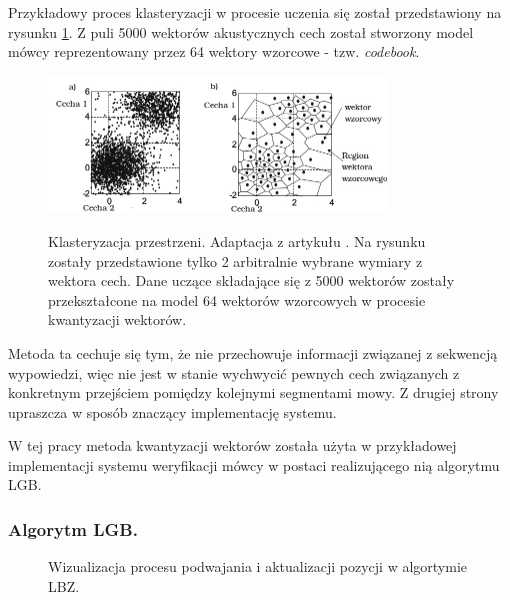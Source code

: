 Przykładowy proces klasteryzacji w procesie uczenia się został przedstawiony na rysunku \ref{VQjpg}. Z puli 5000 wektorów akustycznych cech został stworzony model mówcy reprezentowany przez 64 wektory wzorcowe - tzw. \textit{codebook}.

\begin{figure}[ht!]
  \centering
    \includegraphics[width=0.8\textwidth]{overwiewVQ.jpg}
    \label{VQjpg}
    \caption{Klasteryzacja przestrzeni. Adaptacja z artykułu \cite{overview}. Na rysunku zostały przedstawione tylko 2 arbitralnie wybrane wymiary z wektora cech. Dane uczące składające się z 5000 wektorów zostały przekształcone na model 64 wektorów wzorcowych w procesie kwantyzacji wektorów.}
\end{figure}

Metoda ta cechuje się tym, że nie przechowuje informacji związanej z sekwencją wypowiedzi, więc nie jest w stanie wychwycić pewnych cech związanych z konkretnym przejściem pomiędzy kolejnymi segmentami mowy. Z drugiej strony upraszcza w sposób znaczący implementację systemu.


W tej pracy metoda kwantyzacji wektorów została użyta w przykładowej implementacji systemu weryfikacji mówcy w postaci realizującego nią algorytmu LGB.

\subsubsection{Algorytm LGB.}

\begin{figure}
  \centering
    
    \caption{\label{lgbvis} Wizualizacja procesu podwajania i aktualizacji pozycji w algortymie LBZ.}
\end{figure}

